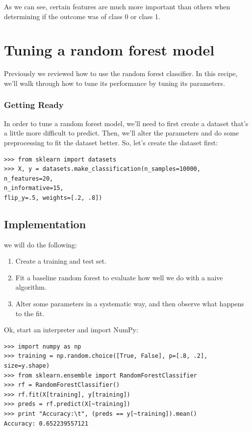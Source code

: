 \documentclass[SKL-MASTER.tex]{subfiles}
\begin{document}
As we can see, certain features are much more important than others when determining if the
outcome was of class 0 or class 1.
\newpage

\section{Tuning a random forest model}
Previously we reviewed how to use the random forest classifier. In this recipe,
we'll walk through how to tune its performance by tuning its parameters.
\subsubsection*{Getting Ready}
In order to tune a random forest model, we'll need to first create a dataset that's a little
more difficult to predict. Then, we'll alter the parameters and do some preprocessing to
fit the dataset better.
So, let's create the dataset first:
\begin{framed}
	\begin{verbatim}
>>> from sklearn import datasets
>>> X, y = datasets.make_classification(n_samples=10000,
n_features=20,
n_informative=15,
flip_y=.5, weights=[.2, .8])
\end{verbatim}
\end{framed}
\subsection*{Implementation}
we will do the following:
\begin{enumerate}
\item Create a training and test set. 
\item Fit a baseline random forest to evaluate how well we do with a naive algorithm.
\item Alter some parameters in a systematic way, and then observe what happens to the fit.
\end{enumerate}
Ok, start an interpreter and import NumPy:
\begin{framed}
	\begin{verbatim}
>>> import numpy as np
>>> training = np.random.choice([True, False], p=[.8, .2],
size=y.shape)
>>> from sklearn.ensemble import RandomForestClassifier
>>> rf = RandomForestClassifier()
>>> rf.fit(X[training], y[training])
>>> preds = rf.predict(X[~training])
>>> print "Accuracy:\t", (preds == y[~training]).mean()
Accuracy: 0.652239557121
\end{verbatim}
\end{framed}
\end{document}
